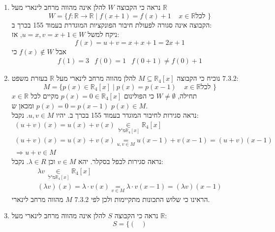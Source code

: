 \documentclass{article}
\newcommand\underrel[2]{\mathrel{\mathop{#2}\limits_{#1}}}
\begin{document}
\begin{enumerate}[i]
    \item נראה כי הקבוצה $W$ להלן אינה מהווה מרחב לינארי מעל $\mathbb{R}$
          \[
              W=\{f: \mathbb{R} \rightarrow \mathbb{R} \; | \; f(x+1) = f(x)+1 \;\;\;\; x\in \mathbb{R} \text{לכל } \}
          \]
          הקבוצה אינה סגורה לפעולת חיבור הפונקציות המוגדרת בעמוד 155 בכרך ב: \\
          ניקח למשל $u=x, v=x+1\in W$, אז:
          \[
              f(x)=u+v=
              x+x+1=
              2x+1
          \]
          אבל $f(x)\notin W$
          כי
          \[
              \begin{matrix}
                  f(1)=3 & f(0) = 1 & f(0+1)\ne f(0)+1
              \end{matrix}
          \]
    \item נוכיח כי הקבוצה $M\subseteq \mathbb{R}_4[x]$ להלן מהווה מרחב לינארי מעל $\mathbb{R}$ בעזרת משפט $7.3.2$:
          \[
              M=\{p(x)\in \mathbb{R}_4[x] \; | \; p(x) = p(x-1) \;\;\;\; x\in \mathbb{R} \text{לכל } \}
          \]
          תחילה, $W\ne \emptyset$
          כי הפולינום $p(x)=0\in \mathbb{R}_4[x]$ מקיים לכל $x\in \mathbb{R}$ $p(x)=0=p(x-1)$ ומכאן ש $p(x)\in M$.\\
          נראה סגירות לחיבור המוגדר בעמוד 155 בכרך ב. יהיו $u,v\in M$. נקבל:
          \[
              \begin{matrix}
                  (u + v)(x) = u(x)+v(x) \underrel{\text{ מ"ל} \mathbb{R}_4[x]}{\in} \mathbb{R}_4[x] \\
                  (u+v)(x)=u(x)+v(x)\underrel{u,v\in M}{=} u(x-1)+v(x-1)=(u+v)(x-1)                  \\
                  \Rightarrow u+v\in M
              \end{matrix}
          \]
          נראה סגירות לכפל בסקלר. יהא $v\in M$ וכן $\lambda \in R$. נקבל:
          \[
              \begin{matrix}
                  \lambda v \underrel{\text{ מ"ל} \mathbb{R}_4[x]}{\in} \mathbb{R}_4[x] \\
                  (\lambda v)(x) = \lambda \cdot v(x) \underrel{v\in M}{=} \lambda \cdot v(x-1)= (\lambda v)(x-1)
              \end{matrix}
          \]
          הראינו כי שלוש התכונות מתקיימות ולכן לפי $7.3.2$ $M$ מהווה מרחב לינארי.\
    \item נראה כי הקבוצה $S$ להלן אינה מהווה מרחב לינארי מעל $\mathbb{R}$:
          \[
              S = \{ \begin{pmatrix}

\end{pmatrix}\]
\end{enumerate}
\end{document}
